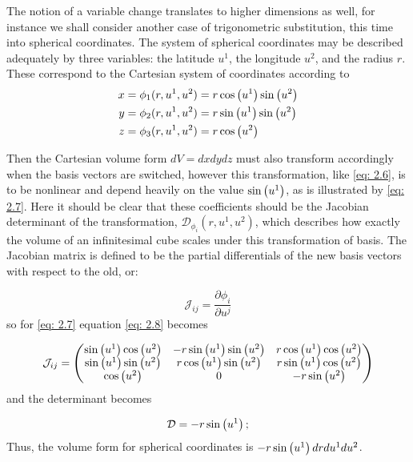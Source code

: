\documentclass[.../main.tex]{subfiles}
\begin{document}
The notion of a variable change translates to higher dimensions as well, for instance we shall consider another case of trigonometric substitution, this time into spherical coordinates. The system of spherical coordinates may be described adequately by three variables: the latitude $u^1$, the longitude $u^2$, and the radius $r$. These correspond to the Cartesian system of coordinates according to
\begin{equation}
  \begin{split}
  	x &= \phi_1 (r, u^1, u^2) = r \cos \left( u^1 \right) \sin \left( u^2 \right) \\
  	y &= \phi_2 (r, u^1, u^2) = r \sin \left( u^1 \right) \sin \left( u^2 \right) \\
  	z &= \phi_3 (r, u^1, u^2) = r \cos \left( u^2 \right)
  \end{split}
	\label{eq: 2.7}
\end{equation}

Then the Cartesian volume form $dV = dxdydz$ must also transform accordingly when the basis vectors are switched, however this transformation, like \ref{eq: 2.6}, is to be nonlinear and depend heavily on the value $\sin \left( u^1 \right)$, as is illustrated by \ref{eq: 2.7}. Here it should be clear that these coefficients should be the Jacobian determinant of the transformation, $\mathcal{D}_{\phi_i} (r, u^1, u^2)$, which describes how exactly the volume of an infinitesimal cube scales under this transformation of basis. The Jacobian matrix is defined to be the partial differentials of the new basis vectors with respect to the old\footnotemark, or:

\begin{equation}
	\mathcal{J}_{ij} = \frac{\partial \phi_i}{\partial u^j}
	\label{eq: 2.8}
\end{equation}
so for \ref{eq: 2.7} equation \ref{eq: 2.8} becomes

\begin{equation}
	\mathcal{J}_{ij} = 
	\begin{pmatrix}
		\sin \left( u^1 \right)\cos \left( u^2 \right) & -r\sin \left( u^1 \right)\sin \left( u^2 \right) & r\cos \left( u^1 \right)\cos \left( u^2 \right) \\
		\sin \left( u^1 \right)\sin \left( u^2 \right) & r\cos \left( u^1 \right)\sin \left( u^2 \right) & r\sin \left( u^1 \right)\cos \left( u^2 \right) \\
		\cos \left( u^2 \right) & 0 & -r\sin \left( u^2 \right)
	\end{pmatrix}
	\label{eq: 2.9}
\end{equation}
and the determinant becomes

\begin{equation}
	\mathcal{D} = -r\sin \left( u^1 \right);
	\label{eq: 2.10}
\end{equation}
Thus, the volume form for spherical coordinates is $-r\sin \left( u^1 \right) drdu^1du^2$.
\end{document}
